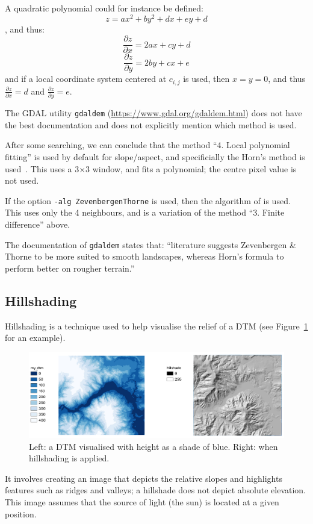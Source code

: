 A quadratic polynomial could for instance be defined:
\[
  z = ax^2 + by^2 + dx + ey +d
\]
, and thus:
\[
  \frac{\partial z}{\partial x} = 2ax + cy + d
\]
\[
  \frac{\partial z}{\partial y} = 2by + cx + e
\]
and if a local coordinate system centered at $c_{i,j}$ is used, then $x = y = 0$, and thus $\frac{\partial z}{\partial x} = d$ and $\frac{\partial z}{\partial y} = e$.


\begin{practice-box}
The GDAL utility \texttt{gdaldem} (\url{https://www.gdal.org/gdaldem.html}) does not have the best documentation and does not explicitly mention which method is used.

After some searching, we can conclude that the method ``4. Local polynomial fitting'' is used by default for slope/aspect, and specificially the Horn's method is used~\citep{Horn81}.
This uses a 3$\times$3 window, and fits a polynomial; the centre pixel value is not used.

If the option \texttt{-alg ZevenbergenThorne} is used, then the algorithm of \citet{Zevenbergen87} is used. 
This uses only the 4 neighbours, and is a variation of the method ``3. Finite difference'' above.

The documentation of \texttt{gdaldem} states that: ``literature suggests Zevenbergen \& Thorne to be more suited to smooth landscapes, whereas Horn's formula to perform better on rougher terrain.''
\end{practice-box}

\subsection{Hillshading}

Hillshading is a technique used to help visualise the relief of a DTM (see Figure~\ref{fig:hillshade} for an example).
\begin{figure}
  \centering
  \includegraphics[width=\linewidth]{figs/hillshade}
  \caption{Left: a DTM visualised with height as a shade of blue. Right: when hillshading is applied.}
\label{fig:hillshade}
\end{figure}
It involves creating an image that depicts the relative slopes and highlights features such as ridges and valleys; a hillshade does not depict absolute elevation.
This image assumes that the source of light (the sun) is located at a given position.

